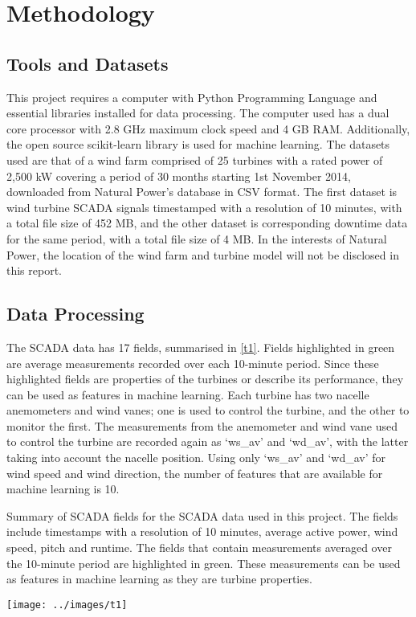 \chapter{Methodology}\label{c2}

\section{Tools and Datasets}

This project requires a computer with Python Programming Language \cite{Welco}
and essential libraries installed for data processing. The computer used has a
dual core processor with 2.8 GHz maximum clock speed and 4 GB RAM.
Additionally, the open source scikit-learn library \cite{Pedre11} is used for
machine learning. The datasets used are that of a wind farm comprised of 25
turbines with a rated power of 2,500 kW covering a period of 30 months
starting 1st November 2014, downloaded from Natural Power's database in CSV
format. The first dataset is wind turbine SCADA signals timestamped with a
resolution of 10 minutes, with a total file size of 452 MB, and the other
dataset is corresponding downtime data for the same period, with a total file
size of 4 MB. In the interests of Natural Power, the location of the wind farm
and turbine model will not be disclosed in this report.

\section{Data Processing}

The SCADA data has 17 fields, summarised in \autoref{t1}. Fields highlighted
in green are average measurements recorded over each 10-minute period. Since
these highlighted fields are properties of the turbines or describe its
performance, they can be used as features in machine learning. Each turbine
has two nacelle anemometers and wind vanes; one is used to control the
turbine, and the other to monitor the first. The measurements from the
anemometer and wind vane used to control the turbine are recorded again as
`ws\_av' and `wd\_av', with the latter taking into account the nacelle position.
Using only `ws\_av' and `wd\_av' for wind speed and wind direction, the number of
features that are available for machine learning is 10.

\begin{table}
  \centering
  \caption{\label{t1}Summary of SCADA fields for the SCADA data used in this
  project. The fields include timestamps with a resolution of 10 minutes,
  average active power, wind speed, pitch and runtime. The fields that contain
  measurements averaged over the 10-minute period are highlighted in green.
  These measurements can be used as features in machine learning as they are
  turbine properties.}
  \texttt{[image: ../images/t1]}
\end{table}

